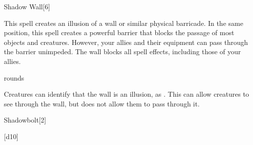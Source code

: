 \begin{spellsection}{Shadow Wall}[6]
    \begin{spellheader}
    \end{spellheader}
    \begin{spellcontent}
        \begin{spelltargetinginfo}
        \end{spelltargetinginfo}
        \begin{spelleffects}
            \spelleffect This spell creates an illusion of a wall or similar physical barricade.
            In the same position, this spell creates a powerful barrier that blocks the passage of most objects and creatures.
            However, your allies and their equipment can pass through the barrier unimpeded.
            The wall blocks all spell effects, including those of your allies.

             rounds
        \end{spelleffects}
    \end{spellcontent}
    \begin{spellfooter}
        \spellnotes Creatures can identify that the wall is an illusion, as .
        This can allow creatures to see through the wall, but does not allow them to pass through it.
        \miscastexplode
    \end{spellfooter}
\end{spellsection}

\begin{spellsection}{Shadowbolt}[2]
    \begin{spellheader}
    \end{spellheader}
    \begin{spellcontent}
        \begin{spelltargetinginfo}
        \end{spelltargetinginfo}
        \begin{spelleffects}
            \spelleffect {}[d10]
        \end{spelleffects}
    \end{spellcontent}
    \begin{spellfooter}
        \spellnotes \subtlespellnotes
        \miscastexplode
    \end{spellfooter}
    \begin{spellaugments}
    \end{spellaugments}
\end{spellsection}

